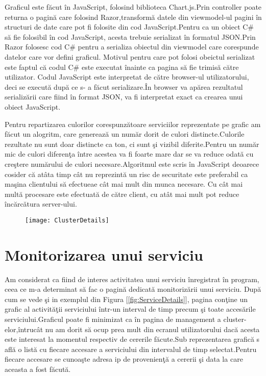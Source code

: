 \documentclass[a4paper,12pt]{report}
\let\oldref\ref
\renewcommand{\ref}[1]{[\oldref{#1}]}
\begin{document}
Graficul este f\u acut \^in JavaScript, folosind biblioteca
Chart.js.Prin controller poate returna o pagin\u a care folosind Razor,transform\u a 
datele din viewmodel-ul pagini \^in structuri de date care pot fi folosite 
din cod JavaScript.Pentru ca un obiect C\# s\u a fie folosibil \^in cod JavaScript, acesta trebuie 
serializat \^in formatul JSON.Prin Razor folosesc cod C\# pentru a serializa obiectul din viewmodel care corespunde datelor 
care vor defini graficul. Motivul pentru care pot folosi obeictul serializat este faptul c\u a codul C\# este executat \^inainte ca 
pagina s\u a fie trimis\u a c\u atre utilizator. Codul JavaScript este interpretat de c\u atre browser-ul utilizatorului, deci 
se execut\u a dup\u a ce s- a f\u acut serializare.\^In browser va ap\u area rezultatul serializ\u arii care fiind \^in format JSON,
va fi interpretat exact ca crearea unui obiect JavaScript.

Pentru repartizarea culorilor corespunz\u atoare serviciilor reprezentate pe grafic am f\u acut un alogritm,
care genereaz\u a un num\u ar dorit de culori distincte.Culorile rezultate nu sunt doar distincte ca ton, ci 
sunt \c si vizibil diferite.Pentru un num\u ar mic de culori diferen\c ta \^intre acestea va fi foarte mare dar se 
va reduce odat\u a cu cre\c stere num\u arului de culori necesare.Algoritmul este scris \^in JavaScript deoarece 
cosider c\u a at\^ata timp c\^at nu reprezint\u a un risc de securitate este preferabil ca ma\c sina clientului 
s\u a efectueae c\^at mai mult din munca necesare. Cu c\^at mai mult\u a procesare este efectuat\u a de c\u atre client,
cu at\^at mai mult pot reduce \^inc\u arc\u atura server-ului.  

\begin{figure}[!htb]
	\texttt{[image: ClusterDetails]}
	\label{fig:ClusterDetails}
\end{figure}

\section{Monitorizarea unui serviciu}

Am considerat ca fiind de interes activitatea unui serviciu \^inregistrat \^in program,
ceea ce m-a determinat s\u a fac o pagin\u a dedicat\u a monitoriz\u arii unui serviciu.
Dup\u a cum se vede \c si in exemplul din Figura  \ref{fig:ServiceDetails}, pagina con\c tine un 
grafic al activit\u a\c tii serviciului \^intr-un interval de timp precum \c si toate 
acces\u arile serviciului.Graficul poate fi minimizat ca \^in pagina de management a cluster-elor,\^intruc\^at nu am dorit s\u a ocup prea 
mult din ecranul utilizatorului dac\u a acesta este interesat la momentul respectiv de 
cererile f\u acute.Sub reprezentarea grafic\u a s afl\u a o list\u a cu fiecare accesare
a serviciului din intervalul de timp selectat.Pentru fiecare accesare se cunoa\c ste 
adresa ip de provenien\c t\u a a cererii \c si data la care aceasta a fost f\u acut\u a. 
\end{document}
